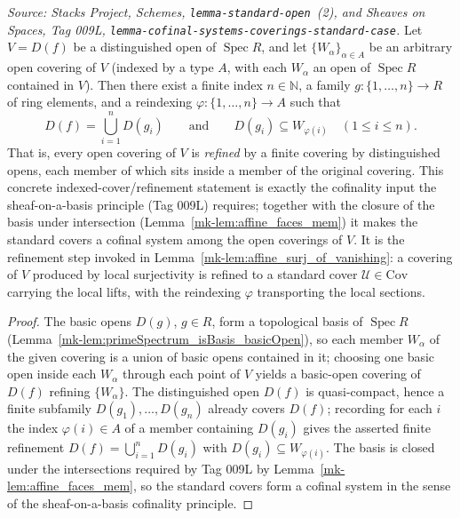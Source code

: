 \begin{lemma}\label{mk-lem:standard_cover_cofinal}
  \leanok

  \textit{Source: Stacks Project, Schemes, \texttt{lemma-standard-open}~(2), and
  Sheaves on Spaces, Tag 009L, \texttt{lemma-cofinal-systems-coverings-standard-case}.}
  Let \(V = D(f)\) be a distinguished open of \(\operatorname{Spec} R\), and let
  \(\{W_\alpha\}_{\alpha \in A}\) be an arbitrary open covering of \(V\) (indexed by a type \(A\),
  with each \(W_\alpha\) an open of \(\operatorname{Spec} R\) contained in \(V\)). Then there exist a
  finite index \(n \in \mathbb{N}\), a family \(g : \{1,\dots,n\} \to R\) of ring elements, and a
  reindexing \(\varphi : \{1,\dots,n\} \to A\) such that
  \[
    D(f) = \bigcup_{i=1}^n D(g_i)
    \qquad\text{and}\qquad
    D(g_i) \subseteq W_{\varphi(i)} \quad (1 \le i \le n).
  \]
  That is, every open covering of \(V\) is \emph{refined} by a finite covering by distinguished opens,
  each member of which sits inside a member of the original covering. This concrete
  indexed-cover/refinement statement is exactly the cofinality input the sheaf-on-a-basis principle
  (Tag 009L) requires; together with the closure of the basis under intersection
  (Lemma~\ref{mk-lem:affine_faces_mem}) it makes the standard covers a cofinal system among the open
  coverings of \(V\). It is the refinement step invoked in
  Lemma~\ref{mk-lem:affine_surj_of_vanishing}: a covering of \(V\) produced by local surjectivity is
  refined to a standard cover \(\mathcal{U} \in \mathrm{Cov}\) carrying the local lifts, with the
  reindexing \(\varphi\) transporting the local sections.
\end{lemma}
\begin{proof}
  \leanok
  The basic opens \(D(g)\), \(g \in R\), form a topological basis of \(\operatorname{Spec} R\)
  (Lemma~\ref{mk-lem:primeSpectrum_isBasis_basicOpen}), so each member \(W_\alpha\) of the given covering
  is a union of basic opens contained in it; choosing one basic open inside each \(W_\alpha\) through
  each point of \(V\) yields a basic-open covering of \(D(f)\) refining \(\{W_\alpha\}\). The
  distinguished open \(D(f)\) is quasi-compact, hence a finite subfamily
  \(D(g_1), \dots, D(g_n)\) already covers \(D(f)\); recording for each \(i\) the index
  \(\varphi(i) \in A\) of a member containing \(D(g_i)\) gives the asserted finite refinement
  \(D(f) = \bigcup_{i=1}^n D(g_i)\) with \(D(g_i) \subseteq W_{\varphi(i)}\). The basis is closed
  under the intersections required by Tag 009L by Lemma~\ref{mk-lem:affine_faces_mem}, so the standard
  covers form a cofinal system in the sense of the sheaf-on-a-basis cofinality principle.
\end{proof}

